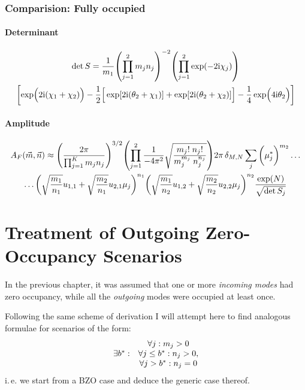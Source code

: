 \documentclass[
	english,
	a4paper,
	fontsize=10pt,
	parskip=half,
	titlepage=true,
	DIV=12,
	final
]{scrreprt}
\newcommand*{\ie}{i.\,e.\xspace}
\newcommand*{\iunit}{\ensuremath{\mathrm{i}}}
\begin{document}
\subsection{Comparision: Fully occupied}
\subsubsection{Determinant}
\begin{multline*}
	\det S
=
	\frac{1}{m_1}
	\qty( \prod_{j=1}^{2} m_j n_j)^{-2}
	\qty( \prod_{j=1}^{2} \exp(-2\iunit \chi_j) )
\\
	\qty[
		\exp( \Big. 2\iunit (\chi_1 + \chi_2) )
		-\frac{1}{2} \qty[ \Big.
			\exp[2\iunit (\theta_2 + \chi_1)] +
			\exp[2\iunit (\theta_2 + \chi_2)]
		]
		-
		\frac{1}{4}\exp( \Big. 4\iunit \theta_2 )
	]
\end{multline*}

\subsubsection{Amplitude}
\begin{multline}
	A_F(\vec{m}, \vec{n})
\approx
	\qty(\frac
		{2\pi}
		{\prod_{j=1}^{K} m_j n_j}
	)^{3/2}
	\qty(
		\prod_{j=1}^{2}
		\frac
			{1}
			{-4\pi^{2}}
		\sqrt{\frac
			{m_j!      \; n_j!}
			{m_j^{m_j} \; n_j^{n_j} }
		}
	)
	2\pi \, \delta_{M,N}
	\sum_{j}
		\qty(\bigg. \mu_j^*)^{m_2}
	\ldots
\\
	\ldots
		\qty(\sqrt{\frac{m_1}{n_1}} u_{1,1}  +  \sqrt{\frac{m_2}{n_1}} u_{2,1} \mu_{j})^{n_1}
		\qty(\sqrt{\frac{m_1}{n_2}} u_{1,2}  +  \sqrt{\frac{m_2}{n_2}} u_{2,2} \mu_{j})^{n_2}
	\frac
		{\exp(N)}
		{\sqrt{\det S_j}}
\end{multline}

\chapter{Treatment of Outgoing Zero-Occupancy Scenarios}
In the previous chapter, it was assumed that one or more \emph{incoming modes} had zero occupancy, while all the \emph{outgoing} modes were occupied at least once.

Following the same scheme of derivation I will attempt here to find analogous formulae for scenarios of the form:
\begin{align}
	\mqty{
						& \forall j : m_j > 0 \\
		\exists b^* :	& \forall j \leq b^* : n_j > 0,\\
						& \forall j   >  b^* : n_j = 0
	}
\end{align}
\ie we start from a BZO case and deduce the generic case thereof.
\end{document}
